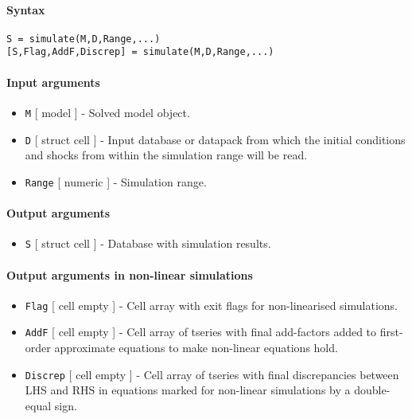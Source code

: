 


	\paragraph{Syntax}

\begin{verbatim}
S = simulate(M,D,Range,...)
[S,Flag,AddF,Discrep] = simulate(M,D,Range,...)
\end{verbatim}

\paragraph{Input arguments}

\begin{itemize}
\item
  \texttt{M} {[} model {]} - Solved model object.
\item
  \texttt{D} {[} struct \textbar{} cell {]} - Input database or datapack
  from which the initial conditions and shocks from within the
  simulation range will be read.
\item
  \texttt{Range} {[} numeric {]} - Simulation range.
\end{itemize}

\paragraph{Output arguments}

\begin{itemize}
\itemsep1pt\parskip0pt
\item
  \texttt{S} {[} struct \textbar{} cell {]} - Database with simulation
  results.
\end{itemize}

\paragraph{Output arguments in non-linear
simulations}

\begin{itemize}
\item
  \texttt{Flag} {[} cell \textbar{} empty {]} - Cell array with exit
  flags for non-linearised simulations.
\item
  \texttt{AddF} {[} cell \textbar{} empty {]} - Cell array of tseries
  with final add-factors added to first-order approximate equations to
  make non-linear equations hold.
\item
  \texttt{Discrep} {[} cell \textbar{} empty {]} - Cell array of tseries
  with final discrepancies between LHS and RHS in equations marked for
  non-linear simulations by a double-equal sign.
\end{itemize}

